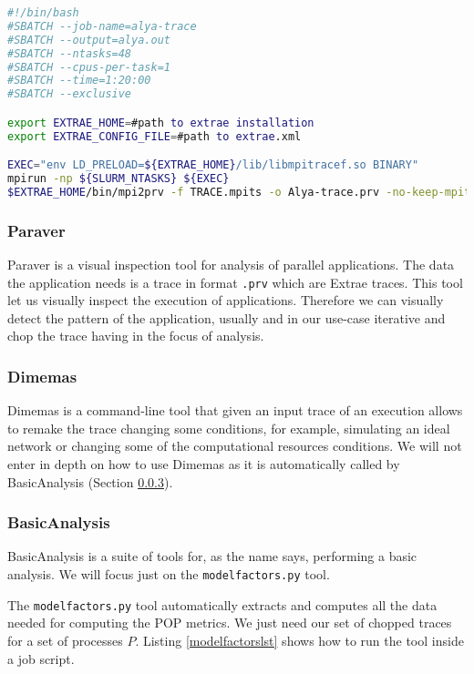 \begin{lstlisting}[language=sh, caption={Running a binary with SLURM and Extrae.}, label={jobtrace}]
#!/bin/bash
#SBATCH --job-name=alya-trace
#SBATCH --output=alya.out
#SBATCH --ntasks=48
#SBATCH --cpus-per-task=1
#SBATCH --time=1:20:00
#SBATCH --exclusive

export EXTRAE_HOME=#path to extrae installation
export EXTRAE_CONFIG_FILE=#path to extrae.xml

EXEC="env LD_PRELOAD=${EXTRAE_HOME}/lib/libmpitracef.so BINARY"
mpirun -np ${SLURM_NTASKS} ${EXEC}
$EXTRAE_HOME/bin/mpi2prv -f TRACE.mpits -o Alya-trace.prv -no-keep-mpits
\end{lstlisting}

\subsubsection{Paraver}

Paraver\cite{paraver} is a visual inspection tool for analysis of parallel applications. The data the application needs is a trace in format \texttt{.prv} which are Extrae traces. This tool let us visually inspect the execution of applications. Therefore we can visually detect the pattern of the application, usually and in our use-case iterative and chop the trace having in the focus of analysis.


\subsubsection{Dimemas}

Dimemas\cite{dimemas} is a command-line tool that given an input trace of an execution allows to remake the trace changing some conditions, for example, simulating an ideal network or changing some of the computational resources conditions. We will not enter in depth on how to use Dimemas as it is automatically called by BasicAnalysis (Section \ref{basicanalysis}).

\subsubsection{BasicAnalysis}\label{basicanalysis}

BasicAnalysis\cite{basic_analysis} is a suite of tools for,  as the name says, performing a basic analysis. We will focus just on the \texttt{modelfactors.py} tool.

The \texttt{modelfactors.py} tool automatically extracts and computes all the data needed for computing the POP metrics. We just need our set of chopped traces for a set of processes $P$. Listing \ref{modelfactorslst} shows how to run the tool inside a job script.

